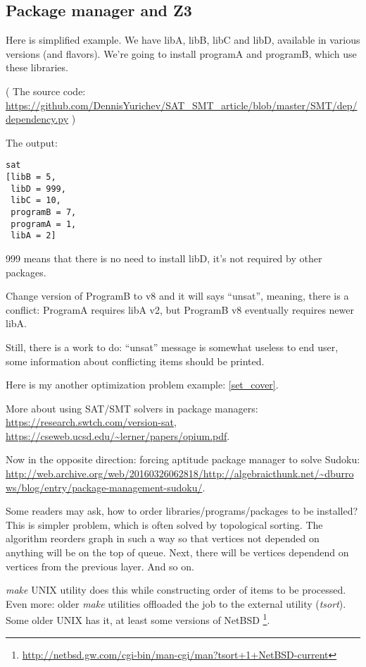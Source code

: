 \subsection{Package manager and Z3}

Here is simplified example.
We have libA, libB, libC and libD, available in various versions (and flavors).
We're going to install programA and programB, which use these libraries.



( The source code: \url{https://github.com/DennisYurichev/SAT_SMT_article/blob/master/SMT/dep/dependency.py} )

The output:

\begin{lstlisting}
sat
[libB = 5,
 libD = 999,
 libC = 10,
 programB = 7,
 programA = 1,
 libA = 2]
\end{lstlisting}

999 means that there is no need to install libD, it's not required by other packages.

Change version of ProgramB to v8 and it will says ``unsat'', meaning, there is a conflict:
ProgramA requires libA v2, but ProgramB v8 eventually requires newer libA.

Still, there is a work to do: ``unsat'' message is somewhat useless to end user,
some information about conflicting items should be printed.

Here is my another optimization problem example: \ref{set_cover}.

More about using SAT/SMT solvers in package managers: \url{https://research.swtch.com/version-sat},
\url{https://cseweb.ucsd.edu/~lerner/papers/opium.pdf}.

Now in the opposite direction: forcing aptitude package manager to solve Sudoku: \\
\url{http://web.archive.org/web/20160326062818/http://algebraicthunk.net/~dburrows/blog/entry/package-management-sudoku/}.

Some readers may ask, how to order libraries/programs/packages to be installed?
This is simpler problem, which is often solved by topological sorting.
The algorithm reorders graph in such a way so that vertices not depended on anything will be on the top of queue.
Next, there will be vertices dependend on vertices from the previous layer.
And so on.

\textit{make} UNIX utility does this while constructing order of items to be processed.
Even more: older \textit{make} utilities offloaded the job to the external utility (\textit{tsort}).
Some older UNIX has it, at least some versions of NetBSD
\footnote{\url{http://netbsd.gw.com/cgi-bin/man-cgi/man?tsort+1+NetBSD-current}}.

